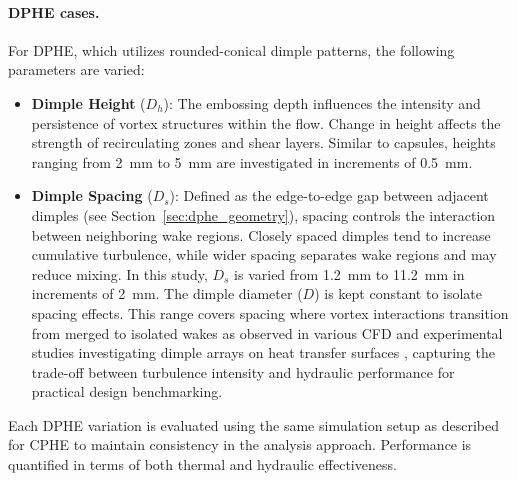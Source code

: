 \documentclass[review,12pt]{elsarticle}
\begin{document}
\paragraph{DPHE cases.}
For DPHE, which utilizes rounded-conical dimple patterns, the following parameters are varied:

\begin{itemize}
  \item \textbf{Dimple Height} ($D_h$): The embossing depth influences the intensity and persistence of vortex structures within the flow. Change in height affects the strength of recirculating zones and shear layers. Similar to capsules, heights ranging from 2~mm to 5~mm are investigated in increments of 0.5~mm.

  \item \textbf{Dimple Spacing} ($D_s$): Defined as the edge-to-edge gap between adjacent dimples (see Section~\ref{sec:dphe_geometry}), spacing controls the interaction between neighboring wake regions. Closely spaced dimples tend to increase cumulative turbulence, while wider spacing separates wake regions and may reduce mixing. In this study, $D_s$ is varied from 1.2~mm to 11.2~mm in increments of 2~mm. The dimple diameter ($D$) is kept constant to isolate spacing effects. This range covers spacing where vortex interactions transition from merged to isolated wakes as observed in various CFD and experimental studies investigating dimple arrays on heat transfer surfaces \citep{oo2019, falih2024}, capturing the trade-off between turbulence intensity and hydraulic performance for practical design benchmarking.
\end{itemize}

Each DPHE variation is evaluated using the same simulation setup as described for CPHE to maintain consistency in the analysis approach. Performance is quantified in terms of both thermal and hydraulic effectiveness.
\end{document}
